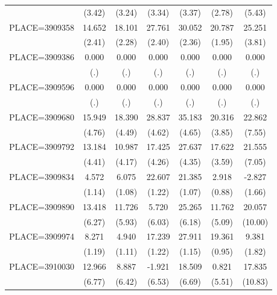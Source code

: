 {\begin{tabular}{l*{6}{c}}
                    &      (3.42)&      (3.24)&      (3.34)&      (3.37)&      (2.78)&      (5.43)\\
PLACE=3909358       &      14.652&      18.101&      27.761&      30.052&      20.787&      25.251\\
                    &      (2.41)&      (2.28)&      (2.40)&      (2.36)&      (1.95)&      (3.81)\\
PLACE=3909386       &       0.000&       0.000&       0.000&       0.000&       0.000&       0.000\\
                    &         (.)&         (.)&         (.)&         (.)&         (.)&         (.)\\
PLACE=3909596       &       0.000&       0.000&       0.000&       0.000&       0.000&       0.000\\
                    &         (.)&         (.)&         (.)&         (.)&         (.)&         (.)\\
PLACE=3909680       &      15.949&      18.390&      28.837&      35.183&      20.316&      22.862\\
                    &      (4.76)&      (4.49)&      (4.62)&      (4.65)&      (3.85)&      (7.55)\\
PLACE=3909792       &      13.184&      10.987&      17.425&      27.637&      17.622&      21.555\\
                    &      (4.41)&      (4.17)&      (4.26)&      (4.35)&      (3.59)&      (7.05)\\
PLACE=3909834       &       4.572&       6.075&      22.607&      21.385&       2.918&      -2.827\\
                    &      (1.14)&      (1.08)&      (1.22)&      (1.07)&      (0.88)&      (1.66)\\
PLACE=3909890       &      13.418&      11.726&       5.720&      25.265&      11.762&      20.057\\
                    &      (6.27)&      (5.93)&      (6.03)&      (6.18)&      (5.09)&     (10.00)\\
PLACE=3909974       &       8.271&       4.940&      17.239&      27.911&      19.361&       9.381\\
                    &      (1.19)&      (1.11)&      (1.22)&      (1.15)&      (0.95)&      (1.82)\\
PLACE=3910030       &      12.966&       8.887&      -1.921&      18.509&       0.821&      17.835\\
                    &      (6.77)&      (6.42)&      (6.53)&      (6.69)&      (5.51)&     (10.83)\\

\end{tabular}}
